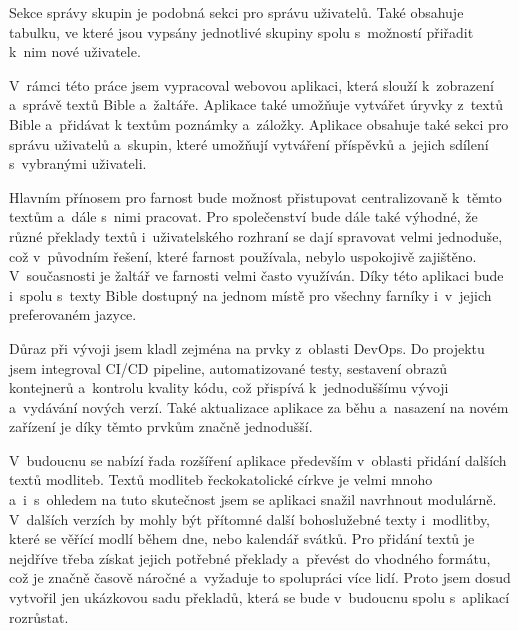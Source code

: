 \documentclass[
  tables=false,
  glossaries,
  index
]{kidiplom}
\begin{document}
Sekce správy skupin je podobná sekci pro správu uživatelů. Také obsahuje tabulku, ve které jsou vypsány jednotlivé skupiny spolu s~možností přiřadit k~nim nové uživatele.

\begin{kiconclusions}
	V~rámci této práce jsem vypracoval webovou aplikaci, která slouží k~zobrazení a~správě textů Bible a~žaltáře. Aplikace také umožňuje vytvářet úryvky z~textů Bible a~přidávat k textům poznámky a~záložky. Aplikace obsahuje také sekci pro správu uživatelů a~skupin, které umožňují vytváření příspěvků a~jejich sdílení s~vybranými uživateli.

	Hlavním přínosem pro farnost bude možnost přistupovat centralizovaně k~těmto textům a~dále s~nimi pracovat. Pro společenství bude dále také výhodné, že různé překlady textů i~uživatelského rozhraní se dají spravovat velmi jednoduše, což v~původním řešení, které farnost používala, nebylo uspokojivě zajištěno. V~současnosti je žaltář ve farnosti velmi často využíván. Díky této aplikaci bude i~spolu s~texty Bible dostupný na jednom místě pro všechny farníky i~v~jejich preferovaném jazyce.

	Důraz při vývoji jsem kladl zejména na prvky z~oblasti DevOps. Do projektu jsem integroval CI/CD pipeline, automatizované testy, sestavení obrazů kontejnerů a~kontrolu kvality kódu, což přispívá k~jednoduššímu vývoji a~vydávání nových verzí. Také aktualizace aplikace za běhu a~nasazení na novém zařízení je díky těmto prvkům značně jednodušší.

	V~budoucnu se nabízí řada rozšíření aplikace především v~oblasti přidání dalších textů modliteb. Textů modliteb řeckokatolické církve je velmi mnoho a~i~s~ohledem na tuto skutečnost jsem se aplikaci snažil navrhnout modulárně. V~dalších verzích by mohly být přítomné další bohoslužebné texty i~modlitby, které se věřící modlí během dne, nebo kalendář svátků. Pro přidání textů je nejdříve třeba získat jejich potřebné překlady a~převést do vhodného formátu, což je značně časově náročné a~vyžaduje to spolupráci více lidí. Proto jsem dosud vytvořil jen ukázkovou sadu překladů, která se bude v~budoucnu spolu s~aplikací rozrůstat.
\end{kiconclusions}
\end{document}
